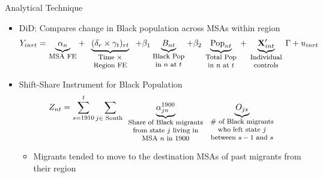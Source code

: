\documentclass[11pt, aspectratio=169]{beamer}
\begin{document}
\begin{frame}{Analytical Technique}

\begin{itemize}
    \item DiD: Compares change in Black population across MSAs within region
        \vspace{-0.2cm} %
        \begin{align}
            Y_{i n r t}=\underbrace{\alpha_n}_{\parbox[t]{1.2cm}{\raggedright \footnotesize \centering MSA FE}}
            +\underbrace{(\delta_r \times \gamma_t)_{r t}}_{\parbox[t]{2cm}{\raggedright \footnotesize \centering Time $\times$ Region FE}}
            +\beta_1 \underbrace{B_{n t}}_{\parbox[t]{1.4cm}{\raggedright \footnotesize \centering Black Pop in $n$ at $t$}}
            +\beta_2 \underbrace{\operatorname{Pop}_{n t}}_{\parbox[t]{1.5cm}{\raggedright \footnotesize \centering Total Pop in $n$ at $t$}}
            +\underbrace{\mathbf{X}_{i n t}^{\prime}}_{\parbox[t]{1.5cm}{\raggedright \footnotesize \centering Individual controls}} \Gamma
            +u_{i n r t}
        \end{align}
        \vspace{-1cm} %
    \item Shift-Share Instrument for Black Population
        \begin{align}
            Z_{n t}=\sum_{s=1910}^t \sum_{j \in \text { South }} \underbrace{\alpha_{j n}^{1900}}_{\parbox[t]{3.3cm}{\raggedright \footnotesize \centering Share of Black migrants from state $j$ living in MSA $n$ in 1900}} \underbrace{O_{j s}}_{\parbox[t]{3cm}{\raggedright \footnotesize \centering \# of Black migrants who left state $j$ between $s-1$ and $s$}}
        \end{align}
        \vspace{-0.6cm} %
        \begin{itemize}
            \item Migrants tended to move to the destination MSAs of past migrants from their region 
        \end{itemize}
\end{itemize}

\end{frame}
\end{document}
